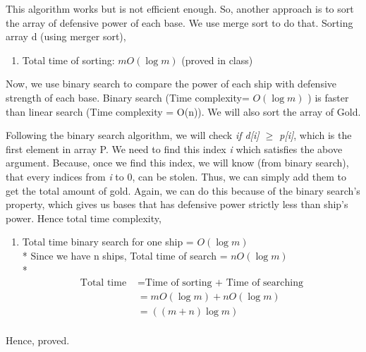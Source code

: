 \documentclass{article}
\theoremstyle{definition}
\begin{document}
This algorithm works but is not efficient enough. So, another approach is to sort the array of defensive power of each base. We use merge sort to do that. Sorting array d (using merger sort),
	\begin{enumerate}
		\item[]Total time of sorting: $ mO(\log m)$ (proved in class)
	\end{enumerate}
Now, we use binary search to compare the power of each ship with defensive strength of each base. Binary search (Time complexity= $O(\log m)$ ) is faster than linear search (Time complexity = O(n)). We will also sort the array of Gold.

Following the binary search algorithm, we will check {\textit {if d[i] $\geq$ p[i]}}, which is the first element in array P. We need to find this index {\textit {i}} which satisfies the above argument. Because, once we find this index, we will know (from binary search), that every indices from {\textit {i}} to 0, can be stolen. Thus, we can simply add them to get the total amount of gold. Again, we can do this because of the binary search's property, which gives us bases that has defensive power strictly less than ship's power. Hence total time complexity, 
	\begin{enumerate}
		\item[]Total time binary search for one ship = $O(\log m)$ \\*
		Since we have n ships, Total time of search = $nO(\log m)$ \\*
		\begin{align*}
			{\text{Total time }} &= {\text{Time of sorting + Time of searching}} \\
		          &= mO(\log m) + nO(\log m)  \\
		          &= ((m+n)\log m)\\
		\end{align*}
	\end{enumerate}
Hence, proved.
\end{document}
